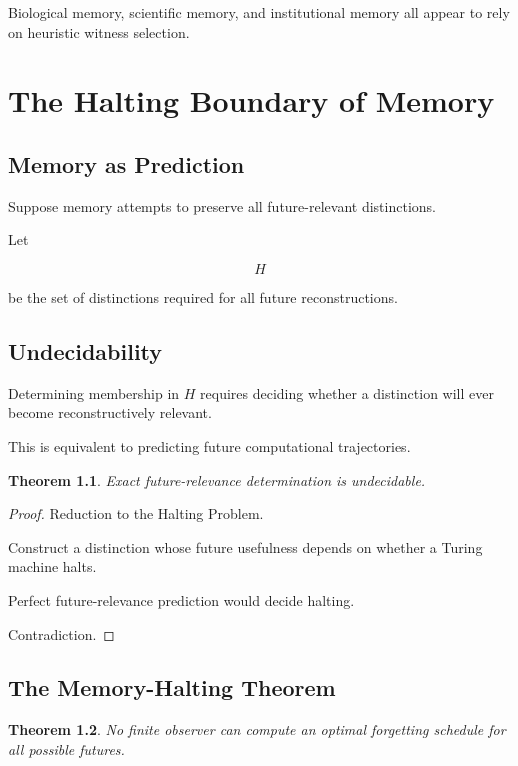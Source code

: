 \documentclass[12pt,oneside]{book}
\theoremstyle{plain} \newtheorem{theorem}{Theorem}[chapter] \newtheorem{lemma}[theorem]{Lemma} \newtheorem{proposition}[theorem]{Proposition} \newtheorem{corollary}[theorem]{Corollary}
\theoremstyle{definition} \newtheorem{definition}[theorem]{Definition} \newtheorem{axiom}[theorem]{Axiom} \newtheorem{construction}[theorem]{Construction}
\theoremstyle{remark} \newtheorem{remark}[theorem]{Remark} \newtheorem{example}[theorem]{Example}
\begin{document}
Biological memory, scientific memory, and institutional memory all appear to rely on heuristic witness selection.

\chapter{The Halting Boundary of Memory}

\section{Memory as Prediction}

Suppose memory attempts to preserve all future-relevant distinctions.

Let

\[
H
\]

be the set of distinctions required for all future reconstructions.

\section{Undecidability}

Determining membership in $H$ requires deciding whether a distinction will ever become reconstructively relevant.

This is equivalent to predicting future computational trajectories.

\begin{theorem}

Exact future-relevance determination is undecidable.

\end{theorem}

\begin{proof}

Reduction to the Halting Problem.

Construct a distinction whose future usefulness depends on whether a Turing machine halts.

Perfect future-relevance prediction would decide halting.

Contradiction.

\end{proof}

\section{The Memory-Halting Theorem}

\begin{theorem}

No finite observer can compute an optimal forgetting schedule for all possible futures.

\end{theorem}
\end{document}
